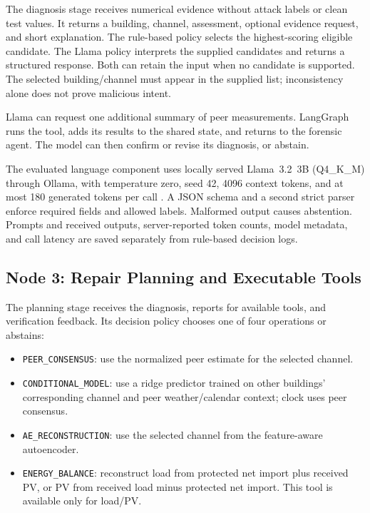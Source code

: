 \documentclass[conference]{IEEEtran}
\begin{document}
The diagnosis stage receives numerical evidence without attack labels or clean test values. It returns a building, channel, assessment, optional evidence request, and short explanation. The rule-based policy selects the highest-scoring eligible candidate. The Llama policy interprets the supplied candidates and returns a structured response. Both can retain the input when no candidate is supported. The selected building/channel must appear in the supplied list; inconsistency alone does not prove malicious intent.

Llama can request one additional summary of peer measurements. LangGraph runs the tool, adds its results to the shared state, and returns to the forensic agent. The model can then confirm or revise its diagnosis, or abstain.

The evaluated language component uses locally served Llama~3.2~3B (Q4\_K\_M) through Ollama, with temperature zero, seed 42, 4096 context tokens, and at most 180 generated tokens per call \cite{llama32,ollamaoutputs}. A JSON schema and a second strict parser enforce required fields and allowed labels. Malformed output causes abstention. Prompts and received outputs, server-reported token counts, model metadata, and call latency are saved separately from rule-based decision logs.

\subsection{Node 3: Repair Planning and Executable Tools}

The planning stage receives the diagnosis, reports for available tools, and verification feedback. Its decision policy chooses one of four operations or abstains:
\begin{itemize}
\item \texttt{PEER\_CONSENSUS}: use the normalized peer estimate for the selected channel.
\item \texttt{CONDITIONAL\_MODEL}: use a ridge predictor trained on other buildings' corresponding channel and peer weather/calendar context; clock uses peer consensus.
\item \texttt{AE\_RECONSTRUCTION}: use the selected channel from the feature-aware autoencoder.
\item \texttt{ENERGY\_BALANCE}: reconstruct load from protected net import plus received PV, or PV from received load minus protected net import. This tool is available only for load/PV.
\end{itemize}
\end{document}
